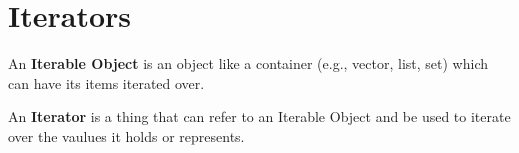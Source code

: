 \section{Iterators}
An \textbf{Iterable Object} is an object like a container (e.g., vector,
list, set) which can have its items iterated over.

An \textbf{Iterator} is a thing that can refer to an Iterable Object and
be used to iterate over the vaulues it holds or represents.